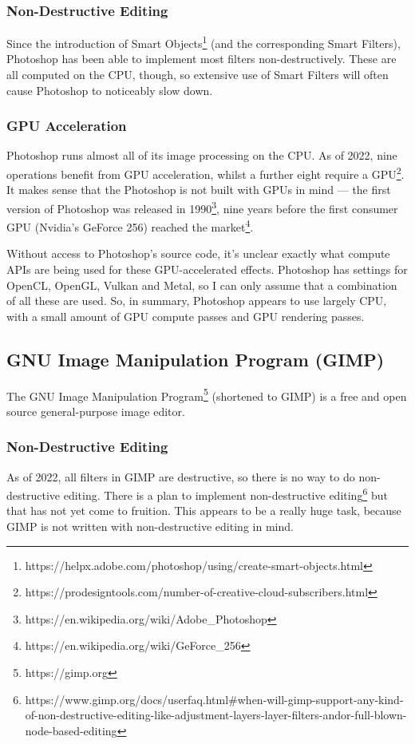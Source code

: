 \documentclass[12pt]{article}
\begin{document}
\subsubsection{Non-Destructive Editing}

Since the introduction of Smart
Objects\footnote{https://helpx.adobe.com/photoshop/using/create-smart-objects.html} (and the
corresponding Smart Filters), Photoshop has been able to implement most filters non-destructively.
These are all computed on the CPU, though, so extensive use of Smart Filters will often cause
Photoshop to noticeably slow down.

\subsubsection{GPU Acceleration}

Photoshop runs almost all of its image processing on the CPU.  As of 2022, nine operations benefit from
GPU acceleration, whilst a further eight require a
GPU\footnote{https://prodesigntools.com/number-of-creative-cloud-subscribers.html}.  It makes sense
that the Photoshop is not built with GPUs in mind --- the first version of Photoshop was released in
1990\footnote{https://en.wikipedia.org/wiki/Adobe\_Photoshop}, nine years before the first consumer
GPU (Nvidia's GeForce 256) reached the market\footnote{https://en.wikipedia.org/wiki/GeForce\_256}.

Without access to Photoshop's source code, it's unclear exactly what compute APIs are being used for
these GPU-accelerated effects.  Photoshop has settings for OpenCL, OpenGL, Vulkan and Metal, so I
can only assume that a combination of all these are used.  So, in summary, Photoshop appears to use
largely CPU, with a small amount of GPU compute passes and GPU rendering passes.

\subsection{GNU Image Manipulation Program (GIMP)}

The GNU Image Manipulation Program\footnote{https://gimp.org} (shortened to GIMP) is a free and open
source general-purpose image editor.

\subsubsection{Non-Destructive Editing}

As of 2022, all filters in GIMP are destructive, so there is no way to do non-destructive editing.
There is a plan to implement non-destructive
editing\footnote{https://www.gimp.org/docs/userfaq.html\#when-will-gimp-support-any-kind-of-non-destructive-editing-like-adjustment-layers-layer-filters-andor-full-blown-node-based-editing}
but that has not yet come to fruition.  This appears to be a really huge task, because GIMP is not
written with non-destructive editing in mind.
\end{document}
